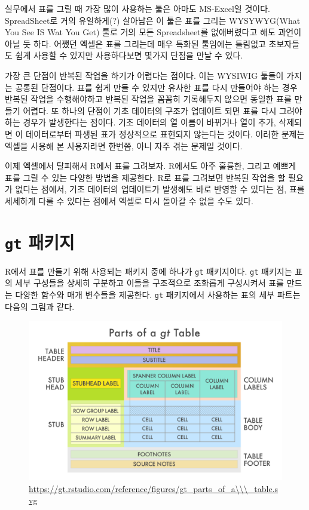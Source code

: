 \documentclass[
]{article}
\begin{document}
실무에서 표를 그릴 때 가장 많이 사용하는 툴은 아마도 MS-Excel일 것이다.
SpreadSheet로 거의 유일하게(?) 살아남은 이 툴은 표를 그리는 WYSYWYG(What
You See IS Wat You Get) 툴로 거의 모든 Spreadsheet를 없애버렸다고 해도
과언이 아닐 듯 하다. 어쨌던 엑셀은 표를 그리는데 매우 특화된 툴임에는
틀림없고 초보자들도 쉽게 사용할 수 있지만 사용하다보면 몇가지 단점을
만날 수 있다.

가장 큰 단점이 반복된 작업을 하기가 어렵다는 점이다. 이는 WYSIWIG 툴들이
가지는 공통된 단점이다. 표를 쉽게 만들 수 있지만 유사한 표를 다시
만들어야 하는 경우 반복된 작업을 수행해야하고 반복된 작업을 꼼꼼히
기록해두지 않으면 동일한 표를 만들기 어렵다. 또 하나의 단점이 기초
데이터의 구조가 업데이트 되면 표를 다시 그려야 하는 경우가 발생한다는
점이다. 기초 데이터의 열 이름이 바뀌거나 열이 추가, 삭제되면 이
데이터로부터 파생된 표가 정상적으로 표현되지 않는다는 것이다. 이러한
문제는 엑셀을 사용해 본 사용자라면 한번쯤, 아니 자주 겪는 문제일 것이다.

이제 엑셀에서 탈피해서 R에서 표를 그려보자. R에서도 아주 훌륭한, 그리고
예쁘게 표를 그릴 수 있는 다양한 방법을 제공한다. R로 표를 그려보면
반복된 작업을 할 필요가 없다는 점에서, 기초 데이터의 업데이트가 발생해도
바로 반영할 수 있다는 점, 표를 세세하게 다룰 수 있다는 점에서 엑셀로
다시 돌아갈 수 없을 수도 있다.

\hypertarget{gt-uxd328uxd0a4uxc9c0}{%
\section{\texorpdfstring{\texttt{gt}
패키지}{gt 패키지}}\label{gt-uxd328uxd0a4uxc9c0}}

R에서 표를 만들기 위해 사용되는 패키지 중에 하나가 \texttt{gt}
패키지이다. \texttt{gt} 패키지는 표의 세부 구성들을 상세히 구분하고
이들을 구조적으로 조화롭게 구성시켜서 표를 만드는 다양한 함수와 매개
변수들을 제공한다. \texttt{gt} 패키지에서 사용하는 표의 세부 파트는
다음의 그림과 같다.

\begin{figure}
\centering
\includegraphics{gt_parts_of_a_table.svg}
\caption{\href{https://gt.rstudio.com/reference/figures/gt_parts_of_a_table.svg}{https://gt.rstudio.com/reference/figures/gt\_parts\_of\_a\textbackslash\textbackslash\textbackslash\_table.svg}}
\end{figure}
\end{document}
